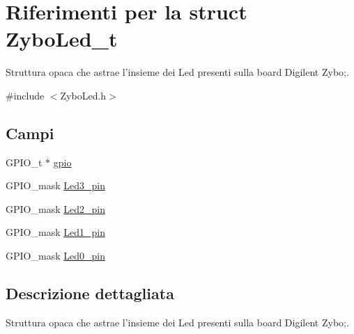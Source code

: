 \hypertarget{struct_zybo_led__t}{\section{Riferimenti per la struct Zybo\+Led\+\_\+t}
\label{struct_zybo_led__t}
}


Struttura opaca che astrae l'insieme dei Led presenti sulla board Digilent Zybo;.  




{\ttfamily \#include $<$Zybo\+Led.\+h$>$}

\subsection*{Campi}
\begin{DoxyCompactItemize}
\item 
G\+P\+I\+O\+\_\+t $\ast$ \hyperlink{struct_zybo_led__t_acb3116190992a4d8d26545c103304d27}{gpio}
\item 
G\+P\+I\+O\+\_\+mask \hyperlink{struct_zybo_led__t_a85b108a2f134972366da967a9489068f}{Led3\+\_\+pin}
\item 
G\+P\+I\+O\+\_\+mask \hyperlink{struct_zybo_led__t_a566ca7784af030de3be9244c99066a5c}{Led2\+\_\+pin}
\item 
G\+P\+I\+O\+\_\+mask \hyperlink{struct_zybo_led__t_a2ee8b92c08972eb1b5bb1b72f4a9d305}{Led1\+\_\+pin}
\item 
G\+P\+I\+O\+\_\+mask \hyperlink{struct_zybo_led__t_aa4d077e557e43132a3100ab30b60165c}{Led0\+\_\+pin}
\end{DoxyCompactItemize}


\subsection{Descrizione dettagliata}
Struttura opaca che astrae l'insieme dei Led presenti sulla board Digilent Zybo;. 

